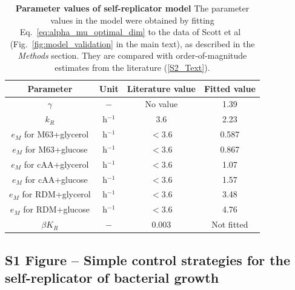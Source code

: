 \begin{table}[h]
\centering
\begin{tabular}{|c|c|c|c|}
\hline
Parameter & Unit & Literature value & Fitted value \\
\hline
$\gamma$ & $-$ & No value & 1.39\\
\hline
$k_R$ & h$^{-1}$ & 3.6 & 2.23\\
\hline
$e_M$ for M63+glycerol & h$^{-1}$ &  $< 3.6$ & 0.587\\
\hline
$e_M$ for M63+glucose & h$^{-1}$ &  $< 3.6$ & 0.867\\
\hline
$e_M$ for cAA+glycerol & h$^{-1}$ &  $< 3.6$ & 1.07\\
\hline
$e_M$ for cAA+glucose & h$^{-1}$ &  $< 3.6$ & 1.57\\
\hline
$e_M$ for RDM+glycerol & h$^{-1}$ &  $< 3.6$ & 3.48\\
\hline
$e_M$ for RDM+glucose & h$^{-1}$ &  $< 3.6$ & 4.76\\
\hline
$\beta K_R$ & $-$  & 0.003 & Not fitted\\
\hline
\end{tabular}
\caption{\textbf{Parameter values of self-replicator model}
The parameter values in the model were obtained by fitting Eq.~\ref{eq:alpha_mu_optimal_dim} to the data of Scott et al~\cite{scott_interdependence_2010} (Fig.~\ref{fig:model_validation} in the main text), as described in the \textit{Methods} section. They are compared with order-of-magnitude estimates from the literature (\ref{S2_Text}).}
\end{table}

\clearpage

\subsection{S1 Figure -- Simple control strategies for the self-replicator of bacterial growth}

